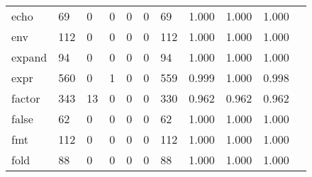 \begin{longtable}{lp{1.10cm}p{1.10cm}p{1.10cm}p{1.10cm}p{1.10cm}p{1.10cm}p{1.10cm}p{1.10cm}p{1.10cm}p{1.10cm}}
echo      &                     69 &                                  0 &                                 0 &                                0 &                                 0 &                              69 &                          1.000 &                                 1.000 &                               1.000 \\
env       &                    112 &                                  0 &                                 0 &                                0 &                                 0 &                             112 &                          1.000 &                                 1.000 &                               1.000 \\
expand    &                     94 &                                  0 &                                 0 &                                0 &                                 0 &                              94 &                          1.000 &                                 1.000 &                               1.000 \\
expr      &                    560 &                                  0 &                                 1 &                                0 &                                 0 &                             559 &                          0.999 &                                 1.000 &                               0.998 \\
factor    &                    343 &                                 13 &                                 0 &                                0 &                                 0 &                             330 &                          0.962 &                                 0.962 &                               0.962 \\
false     &                     62 &                                  0 &                                 0 &                                0 &                                 0 &                              62 &                          1.000 &                                 1.000 &                               1.000 \\
fmt       &                    112 &                                  0 &                                 0 &                                0 &                                 0 &                             112 &                          1.000 &                                 1.000 &                               1.000 \\
fold      &                     88 &                                  0 &                                 0 &                                0 &                                 0 &                              88 &                          1.000 &                                 1.000 &                               1.000 \\

\end{longtable}
